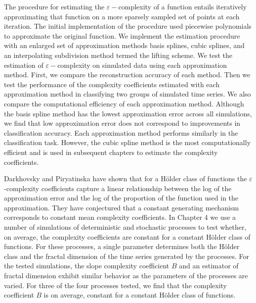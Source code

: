 The procedure for estimating the $\varepsilon-$complexity of a function entails iteratively approximating that
function on a more sparsely sampled set of points at each iteration. 
The initial implementation of the procedure used piecewise polynomials to approximate the original function. We implement the estimation procedure with an enlarged set of approximation methods \textemdash basis splines, cubic splines, and an interpolating subdivision method termed the lifting scheme. We test the estimation of 
$\varepsilon-$complexity on simulated data using each approximation
method. First, we compare the reconstruction accuracy of each method. Then we test the performance of the complexity coefficients estimated with each approximation method in classifying two groups of simulated time series.
We also compare the computational efficiency of each approximation method. Although the basis spline method has the lowest approximation error across all simulations, we find that low approximation error does not correspond to improvements in classification accuracy. Each 
approximation method performs similarly in the classification 
task. However, the cubic spline method is the most computationally efficient and is used in subsequent chapters to estimate the complexity coefficients.

Darkhovsky and Piryatinska have shown that for a H\"older class of functions the $\varepsilon$-complexity coefficients capture a linear relationship between the log of the approximation error and the log of the proportion of the function used in the approximation. They have conjectured that a 
constant generating mechanism corresponds to constant mean complexity coefficients. 
In Chapter 4 we use a number of simulations of deterministic and stochastic processes to test whether, on average, 
the complexity coefficients are constant for a 
constant H\"older class of functions. For these processes, a single parameter determines both the H\"older class and the fractal dimension of the time series generated
by the processes. For the tested simulations, the slope
complexity coefficient $B$ and an estimator
of fractal dimension exhibit similar behavior as the parameters of
the processes are varied. For three of the four processes tested,
we find that the complexity coefficient $B$ is
on average, constant for a constant H\"older class of functions.
 

